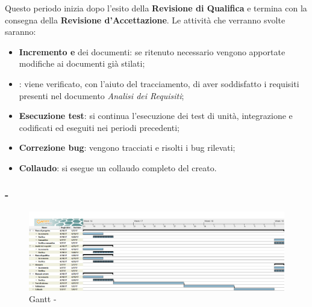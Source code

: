 \documentclass[./PianoDiProgetto.tex]{subfiles}
\begin{document}
  Questo periodo inizia dopo l'esito della \textbf{Revisione di Qualifica} e termina con la consegna della \textbf{Revisione d'Accettazione}. Le attività che verranno svolte saranno:
  \begin{itemize}
    \item \textbf{Incremento e } dei documenti: se ritenuto necessario vengono apportate modifiche ai documenti già stilati;
    \item \textbf{}: viene verificato, con l'aiuto del tracciamento, di aver soddisfatto i requisiti presenti nel documento \textit{Analisi dei Requisiti};
    \item \textbf{Esecuzione test}: si continua l'esecuzione dei test di unità, integrazione e  codificati ed eseguiti nei periodi precedenti;
    \item \textbf{Correzione bug}: vengono tracciati e risolti i bug rilevati;
    \item \textbf{Collaudo}: si esegue un collaudo completo del  creato.
  \end{itemize}

  \subsubsection{ - \PerV}
    \begin{figure}[!h]
    \centering
    \includegraphics[width=\textwidth]{images/V}
    \caption{Gantt - \PerV}
    \end{figure}
\end{document}
